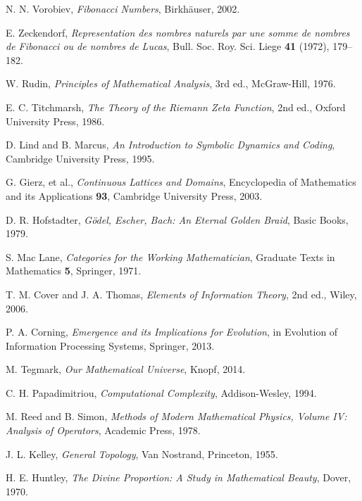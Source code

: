 \documentclass[12pt]{article}
\theoremstyle{plain}
\theoremstyle{definition}
\begin{document}
\begin{thebibliography}{99}

N. N. Vorobiev, \textit{Fibonacci Numbers}, Birkhäuser, 2002.

E. Zeckendorf, \textit{Representation des nombres naturels par une somme de nombres de Fibonacci ou de nombres de Lucas}, Bull. Soc. Roy. Sci. Liege \textbf{41} (1972), 179--182.

W. Rudin, \textit{Principles of Mathematical Analysis}, 3rd ed., McGraw-Hill, 1976.

E. C. Titchmarsh, \textit{The Theory of the Riemann Zeta Function}, 2nd ed., Oxford University Press, 1986.

D. Lind and B. Marcus, \textit{An Introduction to Symbolic Dynamics and Coding}, Cambridge University Press, 1995.

G. Gierz, et al., \textit{Continuous Lattices and Domains}, Encyclopedia of Mathematics and its Applications \textbf{93}, Cambridge University Press, 2003.

D. R. Hofstadter, \textit{Gödel, Escher, Bach: An Eternal Golden Braid}, Basic Books, 1979.

S. Mac Lane, \textit{Categories for the Working Mathematician}, Graduate Texts in Mathematics \textbf{5}, Springer, 1971.

T. M. Cover and J. A. Thomas, \textit{Elements of Information Theory}, 2nd ed., Wiley, 2006.

P. A. Corning, \textit{Emergence and its Implications for Evolution}, in Evolution of Information Processing Systems, Springer, 2013.

M. Tegmark, \textit{Our Mathematical Universe}, Knopf, 2014.

C. H. Papadimitriou, \textit{Computational Complexity}, Addison-Wesley, 1994.

M. Reed and B. Simon, \textit{Methods of Modern Mathematical Physics, Volume IV: Analysis of Operators}, Academic Press, 1978.

J. L. Kelley, \textit{General Topology}, Van Nostrand, Princeton, 1955.

H. E. Huntley, \textit{The Divine Proportion: A Study in Mathematical Beauty}, Dover, 1970.

\end{thebibliography}
\end{document}
